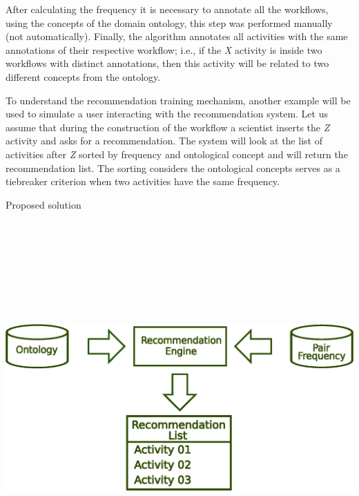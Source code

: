 \documentclass[a0, portrait]{a0poster}
\begin{document}
\begin{multicols}{2}
After calculating the frequency it is necessary to annotate all the workflows, using the concepts of the domain ontology, this step was performed manually (not automatically). Finally, the algorithm annotates all activities with the same annotations of their respective workflow; i.e., if the \emph{X} activity is inside two workflows with distinct annotations, then this activity will be related to two different concepts from the ontology. 

To understand the recommendation training mechanism, another example will be used to simulate a user interacting with the recommendation system. Let us assume that during the construction of the workflow a scientist inserts the \emph{Z} activity and asks for a recommendation. The system will look at the list of activities after \emph{Z} sorted by frequency and ontological concept and will return the recommendation list. The sorting considers the ontological concepts serves as a tiebreaker criterion when two activities have the same frequency.
\vspace{0.25cm}
\begin{center}
\large  \color{darkgreen} Proposed solution \\
\vspace{0.25cm}
\includegraphics[height=15cm, width=28cm]{engineVerdeForte.eps}
\end{center}
\vspace{0.25cm}


\end{multicols}
\end{document}
